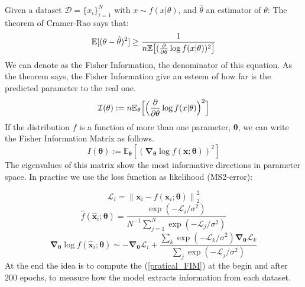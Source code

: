 \documentclass{article}
\begin{document}
Given a dataset $\mathcal{D}=\{x_i\}^{N}_{i=1}$ with $x \sim f(x|\theta)$, and $\hat{\theta}$ an estimator of $\theta$:
The theorem of Cramer-Rao says that:
\begin{equation}
     \mathbb{E}[(\theta-\hat{\theta})^2]\geq \frac{1}{n \mathbb{E}\big{[}(\frac{\partial}{\partial \theta}\log f(x|\theta))^2\big{]}}
\end{equation}
We can denote as the Fisher Information, the denominator of this equation. As the theorem says, the Fisher Information give an esteem of how far is the predicted parameter to the real one.
\begin{equation}
    \mathcal{I}(\theta) := n \mathbb{E}_{\theta}\Big{[}\Big{(}\frac{\partial}{\partial \theta}\log f(x|\theta)\Big{)}^2\Big{]}
\end{equation}
If the distribution $f$ is a function of more than one parameter, $\boldsymbol{\theta}$,  we can write the Fisher Information Matrix as follows.
\begin{equation}
    I(\boldsymbol{\theta}) := \mathbb{E}_{\boldsymbol{\theta}}\left[\left(\boldsymbol{\nabla}_{\boldsymbol{\theta}} \log f(\mathbf{x} ; \boldsymbol{\theta})\right)^{2}\right]
\end{equation}
The eigenvalues of this matrix show the most informative directions in parameter space.
In practise we use the loss function as likelihood (MS2-error):

\begin{equation}
    \mathcal{L}_{i}=\left\|\boldsymbol{x}_{i}-{f}\left(\mathbf{x}_{i} ; \boldsymbol{\theta}\right)\right\|_{2}^{2}
\end{equation}
\begin{equation}
    \widehat{f}\left(\widehat{\mathbf{x}}_{i} ; \boldsymbol{\theta}\right)=\frac{\exp \left(-\mathcal{L}_{i} / \sigma^{2}\right)}{N^{-1} \sum_{j=1}^{N} \exp \left(-\mathcal{L}_{j} / \sigma^{2}\right)}
\end{equation}
\begin{equation}
    \boldsymbol{\nabla}_{\boldsymbol{\theta}} \log f\left(\widehat{\mathbf{x}}_{i} ; \boldsymbol{\theta}\right) \sim-\boldsymbol{\nabla}_{\boldsymbol{\theta}} \mathcal{L}_{i}+\frac{\sum_{k} \exp \left(-\mathcal{L}_{k} / \sigma^{2}\right) \boldsymbol{\nabla}_{\boldsymbol{\theta}} \mathcal{L}_{k}}{\sum_{j} \exp \left(-\mathcal{L}_{j} / \sigma^{2}\right)}
    \label{pratical_FIM}
\end{equation}
At the end the idea is to compute the (\ref{pratical_FIM}) at the begin and after 200 epochs, to measure how the model extracts information from each dataset.
\end{document}
